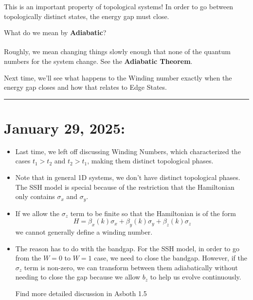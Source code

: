 \documentclass[11pt]{article}
\begin{document}
\begin{redbox}
  This is an important property of topological systems! In order to go between topologically distinct states, the energy gap must close.
\end{redbox}

\begin{bluebox}
  What do we mean by \textbf{Adiabatic}?
  \\
  \\
  Roughly, we mean changing things slowly enough that none of the quantum numbers for the system change. See the \textbf{Adiabatic Theorem}.
\end{bluebox} Next time, we'll see what happens to the Winding number exactly when the energy gap closes and how that relates to Edge States.

\vskip 1cm
\hrule


\pagebreak
\section{January 29, 2025:}

\begin{itemize}
  \item Last time, we left off discussing Winding Numbers, which characterized the cases $t_1 > t_2$ and $t_2 > t_1$, making them distinct topological phases.
  
  \item Note that in general 1D systems, we don't have distinct topological phases. The SSH model is special because of the restriction that the Hamiltonian only contains $\sigma_x$ and $\sigma_y$.
  
  \item If we allow the $\sigma_z$ term to be finite so that the Hamiltonian is of the form $$ H = \beta_x(k) \sigma_x + \beta_y(k) \sigma_y + \beta_z(k) \sigma_z $$ we cannot generally define a winding number.
  
  \item The reason has to do with the bandgap. For the SSH model, in order to go from the $W=0$ to $W=1$ case, we need to close the bandgap. However, if the $\sigma_z$ term is non-zero, we can transform between them adiabatically without needing to close the gap because we allow $b_z$ to help us evolve continuously. \begin{note}
    {Find more detailed discussion in Asboth 1.5}
  \end{note}
\end{itemize}
\end{document}
